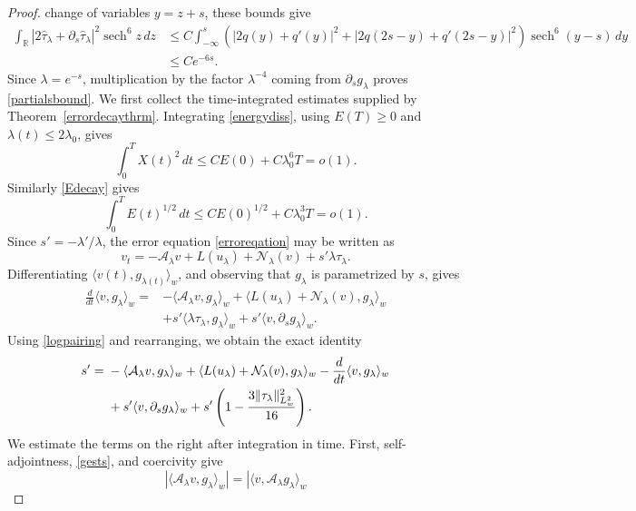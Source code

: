 \documentclass[11pt,a4paper]{article}
\DeclareMathOperator{\sech}{sech}
\numberwithin{equation}{section}
\theoremstyle{plain}
\theoremstyle{remark}
\begin{document}
\begin{proof}
change of variables $y=z+s$, these bounds give
{\small
\begin{align*}
\int_{\mathbb R}
|2\widehat{\tau}_\lambda+\partial_s\widehat{\tau}_\lambda|^2\sech^6z\,dz
&\leq
C\int_{-\infty}^s
\left(
|2q(y)+q'(y)|^2
+
|2q(2s-y)+q'(2s-y)|^2
\right)
\sech^6(y-s)\,dy\\
&\leq
Ce^{-6s}.    
\end{align*}
}
Since $\lambda=e^{-s}$, multiplication by the factor
$\lambda^{-4}$ coming from $\partial_sg_\lambda$ proves
\eqref{partialsbound}.
We first collect the time-integrated estimates supplied by
Theorem~\ref{errordecaythrm}. Integrating
\eqref{energydiss}, using $E(T)\geq0$ and
$\lambda(t)\leq2\lambda_0$, gives
\begin{equation}\label{integrateddissdrift}
\int_0^T X(t)^2\,dt
\leq
C E(0)+C\lambda_0^6T
=o(1).
\end{equation}
Similarly \eqref{Edecay} gives
\begin{equation}\label{Eintegral}
\int_0^T E(t)^{1/2}\,dt
\leq
CE(0)^{1/2}+C\lambda_0^3T
=o(1).
\end{equation}
Since $s'=-\lambda'/\lambda$, the error equation
\eqref{erroreqation} may be written as
$$
v_t
=
-\mathcal A_\lambda v
+
L(u_\lambda)
+
\mathcal N_\lambda(v)
+
s'\lambda\tau_\lambda.
$$
Differentiating $\langle v(t),g_{\lambda(t)}\rangle_w$, and observing that $g_\lambda$ is parametrized by $s$, gives
$$
\begin{aligned}
\frac{d}{dt}\langle v,g_\lambda\rangle_w
={}&
-\langle\mathcal A_\lambda v,g_\lambda\rangle_w
+
\langle L(u_\lambda)+\mathcal N_\lambda(v),g_\lambda\rangle_w\\
&+
s'\langle\lambda\tau_\lambda,g_\lambda\rangle_w
+
s'\langle v,\partial_sg_\lambda\rangle_w.
\end{aligned}
$$
Using \eqref{logpairing} and rearranging, we obtain the
exact identity
\begin{align}
s'
={}&
-\langle\mathcal A_\lambda v,g_\lambda\rangle_w
+
\langle L(u_\lambda)+\mathcal N_\lambda(v),g_\lambda\rangle_w
-\frac{d}{dt}\langle v,g_\lambda\rangle_w
\notag\\
&+
s'\langle v,\partial_sg_\lambda\rangle_w
+
s'
\left(
1-\frac{3\|\tau_\lambda\|_{L_w^2}^2}{16}
\right).
\label{sprime}
\end{align}
We estimate the terms on the right after integration in time.
First, self-adjointness, \eqref{gests}, and coercivity
give
$$
\left|
\langle\mathcal A_\lambda v,g_\lambda\rangle_w
\right|
=
\left|
\langle v,\mathcal A_\lambda g_\lambda\rangle_w
$$
\end{proof}
\end{document}
